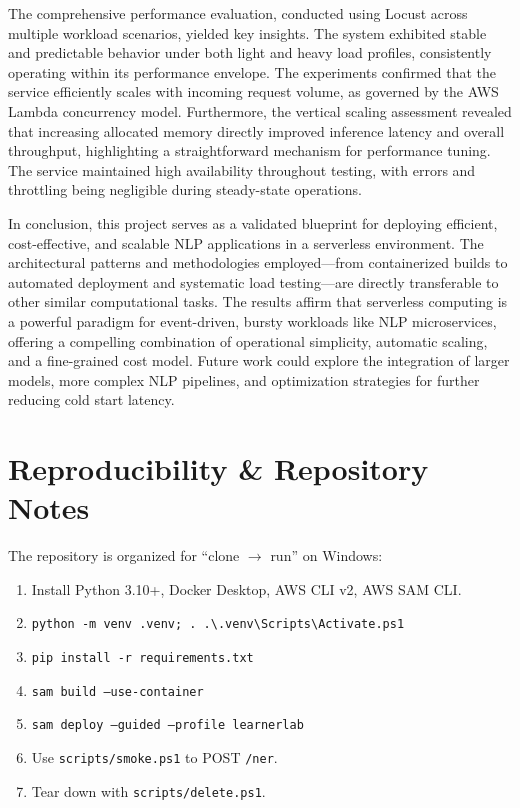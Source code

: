 \documentclass[11pt,a4paper]{article}
\begin{document}
The comprehensive performance evaluation, conducted using Locust across multiple workload scenarios, yielded key insights. The system exhibited stable and predictable behavior under both light and heavy load profiles, consistently operating within its performance envelope. The experiments confirmed that the service efficiently scales with incoming request volume, as governed by the AWS Lambda concurrency model. Furthermore, the vertical scaling assessment revealed that increasing allocated memory directly improved inference latency and overall throughput, highlighting a straightforward mechanism for performance tuning. The service maintained high availability throughout testing, with errors and throttling being negligible during steady-state operations.

In conclusion, this project serves as a validated blueprint for deploying efficient, cost-effective, and scalable NLP applications in a serverless environment. The architectural patterns and methodologies employed—from containerized builds to automated deployment and systematic load testing—are directly transferable to other similar computational tasks. The results affirm that serverless computing is a powerful paradigm for event-driven, bursty workloads like NLP microservices, offering a compelling combination of operational simplicity, automatic scaling, and a fine-grained cost model. Future work could explore the integration of larger models, more complex NLP pipelines, and optimization strategies for further reducing cold start latency.


\section*{Reproducibility \& Repository Notes}
The repository is organized for ``clone $\rightarrow$ run'' on Windows:
\begin{enumerate}[leftmargin=1.3em]
  \item Install Python 3.10+, Docker Desktop, AWS CLI v2, AWS SAM CLI.
  \item \texttt{python -m venv .venv; . .\textbackslash .venv\textbackslash Scripts\textbackslash Activate.ps1}
  \item \texttt{pip install -r requirements.txt}
  \item \texttt{sam build --use-container}
  \item \texttt{sam deploy --guided --profile learnerlab}
  \item Use \texttt{scripts/smoke.ps1} to POST \texttt{/ner}.
  \item Tear down with \texttt{scripts/delete.ps1}.
\end{enumerate}
\end{document}
